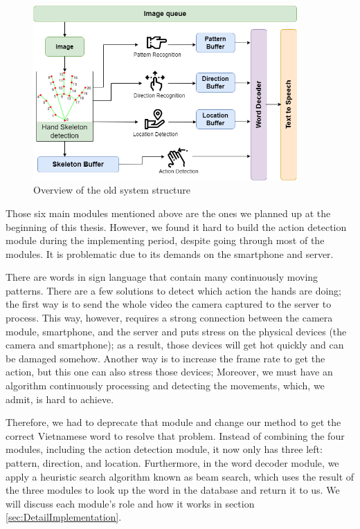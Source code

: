 \begin{figure}[H]
	\centering
	\includegraphics[width=0.9\textwidth]{img/Chap4/OverviewOfTheSystemModules-Old.png}
	\caption{Overview of the old system structure}
	\label{fig:Chap4-OverviewOfTheSystemModules-Old}
\end{figure}

Those six main modules mentioned above are the ones we planned up at the beginning of this thesis. However, we found it hard to build the action detection module during the implementing period, despite going through most of the modules. It is problematic due to its demands on the smartphone and server.

There are words in sign language that contain many continuously moving patterns. There are a few solutions to detect which action the hands are doing; the first way is to send the whole video the camera captured to the server to process. This way, however, requires a strong connection between the camera module, smartphone, and the server and puts stress on the physical devices (the camera and smartphone); as a result, those devices will get hot quickly and can be damaged somehow. Another way is to increase the frame rate to get the action, but this one can also stress those devices; Moreover, we must have an algorithm continuously processing and detecting the movements, which, we admit, is hard to achieve.

Therefore, we had to deprecate that module and change our method to get the correct Vietnamese word to resolve that problem. Instead of combining the four modules, including the action detection module, it now only has three left: pattern, direction, and location. Furthermore, in the word decoder module, we apply a heuristic search algorithm known as beam search, which uses the result of the three modules to look up the word in the database and return it to us. We will discuss each module's role and how it works in section \ref{sec:DetailImplementation}.

